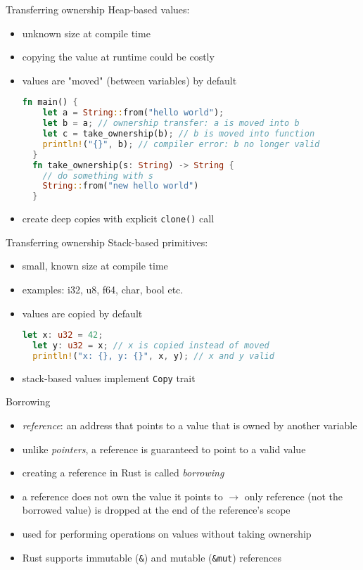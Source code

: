 \documentclass[handout]{beamer}
\begin{document}
\begin{frame}[fragile]{Transferring ownership}
Heap-based values: 
\begin{itemize}
  \item unknown size at compile time
  \item copying the value at runtime could be costly
  \item values are "moved" (between variables) by default

  \begin{lstlisting}[language=Rust]
  fn main() {
    let a = String::from("hello world");
    let b = a; // ownership transfer: a is moved into b
    let c = take_ownership(b); // b is moved into function
    println!("{}", b); // compiler error: b no longer valid
  }
  fn take_ownership(s: String) -> String {
    // do something with s
    String::from("new hello world")
  }
  \end{lstlisting}
  \item create deep copies with explicit \verb|clone()| call
\end{itemize}
\end{frame}


\begin{frame}[fragile]{Transferring ownership}
Stack-based primitives: 
\begin{itemize}
  \item small, known size at compile time
  \item examples: i32, u8, f64, char, bool etc.
  \item values are copied by default

  \begin{lstlisting}[language=Rust]
  let x: u32 = 42;
  let y: u32 = x; // x is copied instead of moved
  println!("x: {}, y: {}", x, y); // x and y valid
  \end{lstlisting}
  \item stack-based values implement \verb|Copy| trait
\end{itemize}
\end{frame}


\begin{frame}[fragile]{Borrowing}
\begin{itemize}
  \item \emph{reference}: an address that points to a value that is owned by another variable
  \item unlike \emph{pointers}, a reference is guaranteed to point to a valid value
  \item creating a reference in Rust is called \emph{borrowing}
  \item a reference does not own the value it points to $\rightarrow$ only reference (not the borrowed value) is dropped at the end of the reference's scope
  \item used for performing operations on values without taking ownership
  \item Rust supports immutable (\verb|&|) and mutable (\verb|&mut|) references
\end{itemize}
\end{frame}
\end{document}
